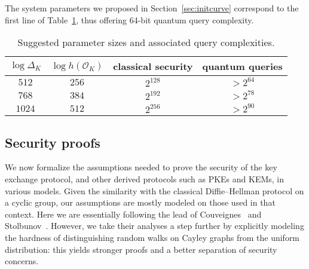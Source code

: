 \documentclass{llncs}
\renewcommand{\O}{\mathcal{O}}
\begin{document}
The system parameters we proposed in Section~\ref{sec:initcurve}
correspond to the first line of Table~\ref{tab:sizes}, thus offering 64-bit
quantum query complexity.


\begin{table}
    \renewcommand{\arraystretch}{1.4}
    \centering
    \begin{tabular}{c@{\;}|@{\;}c@{\;}|@{\;}c@{\;}|@{\;}c}
        $\log Δ_K$ & $\log h(\O_K)$
        & \parbox{10ex}{\centering classical security}
        & \parbox{10ex}{\centering quantum queries} \\
        \hline
        $512$  & $256$ & $2^{128}$ & $> 2^{64}$ \\
        $768$  & $384$ & $2^{192}$ & $> 2^{78}$ \\
        $1024$ & $512$ & $2^{256}$ & $> 2^{90}$
        \\
        \hline
    \end{tabular}
    \smallskip
    \caption{Suggested parameter sizes and associated query complexities.}
    \label{tab:sizes}
\end{table}

\subsection{Security proofs}
\label{sec:proofs}

We now formalize the assumptions needed to prove the security of the
key exchange protocol, and other derived protocols such as PKEs and
KEMs, in various models. Given the similarity with the classical
Diffie--Hellman protocol on a cyclic group, our assumptions are
mostly modeled on those used in that context. Here we are
essentially following the lead of
Couveignes~\cite{cryptoeprint:2006:291} and
Stolbunov~\cite{Stol,Stolbunov2012}.
However, we take their analyses a
step further by explicitly modeling the hardness of distinguishing
random walks on Cayley graphs from the uniform distribution: this
yields stronger proofs and a better separation of security concerns.
\end{document}
